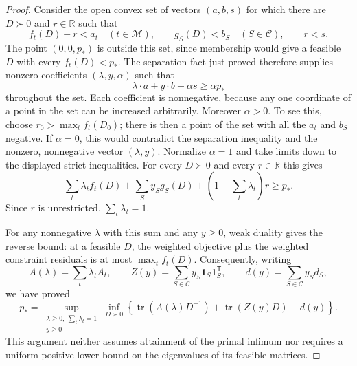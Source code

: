 \begin{proof}
Consider the open convex set of vectors $(a,b,s)$ for which there are
$D\succ0$ and $r\in\mathbb R$ such that
\[
 f_t(D)-r<a_t\quad(t\in\mathcal M),\qquad
 g_S(D)<b_S\quad(S\in\mathcal C),\qquad r<s.
\]
The point $(0,0,p_*)$ is outside this set, since membership would give a
feasible $D$ with every $f_t(D)<p_*$.  The separation fact just proved
therefore supplies nonzero coefficients $(\lambda,y,\alpha)$ such that
\[
 \lambda\cdot a+y\cdot b+\alpha s\geq\alpha p_*
\]
throughout the set.  Each coefficient is nonnegative, because any one
coordinate of a point in the set can be increased arbitrarily.
Moreover $\alpha>0$.  To see this, choose
$r_0>\max_t f_t(D_0)$; there is then a point of the set with all the
$a_t$ and $b_S$ negative.  If $\alpha=0$, this would contradict the
separation inequality and the nonzero, nonnegative vector $(\lambda,y)$.
Normalize $\alpha=1$ and take limits down to the displayed strict
inequalities.  For every $D\succ0$ and every $r\in\mathbb R$ this gives
\[
 \sum_t\lambda_tf_t(D)+\sum_Sy_Sg_S(D)
       +\left(1-\sum_t\lambda_t\right)r\geq p_*.
\]
Since $r$ is unrestricted, $\sum_t\lambda_t=1$.

For any nonnegative $\lambda$ with this sum and any $y\geq0$, weak
duality gives the reverse bound: at a feasible $D$, the weighted
objective plus the weighted constraint residuals is at most
$\max_t f_t(D)$.  Consequently, writing
\[
 A(\lambda)=\sum_t\lambda_tA_t,\qquad
 Z(y)=\sum_{S\in\mathcal C}y_S\mathbf1_S\mathbf1_S^{\mathsf T},\qquad
 d(y)=\sum_{S\in\mathcal C}y_Sd_S,
\]
we have proved
\begin{equation}
\label{hd:lagrange}
 p_*=
 \sup_{\substack{\lambda\geq0,\ \sum_t\lambda_t=1\\y\geq0}}
 \inf_{D\succ0}
 \left\{\operatorname{tr}(A(\lambda)D^{-1})
       +\operatorname{tr}(Z(y)D)-d(y)\right\}.
\end{equation}
This argument neither assumes attainment of the primal infimum nor
requires a uniform positive lower bound on the eigenvalues of its
feasible matrices.


\end{proof}

